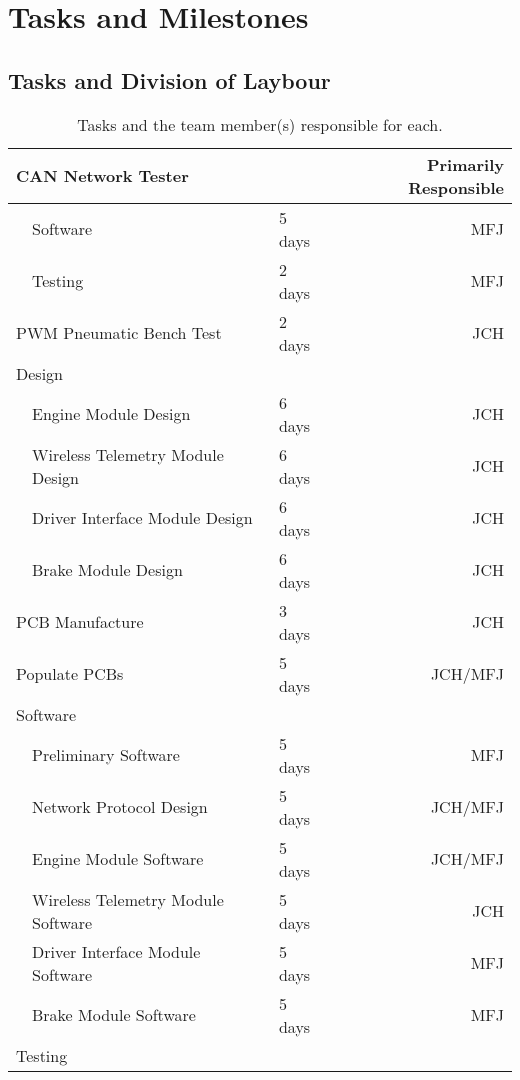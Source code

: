 %
%
%
%

\chapter{Tasks and Milestones}

\section{Tasks and Division of Laybour}

\begin{table}[H]
  \caption{Tasks and the team member(s) responsible for each.}
  \label{table:tasks}
  \centering
  \begin{tabular}{|l|l|l|r|}
  \hline 
  \multicolumn{3}{|l|}{CAN Network Tester} & Primarily Responsible\\
  \hline 
  & Software & 5 days & MFJ\\
  & Testing & 2 days & MFJ\\
  \hline 
  \multicolumn{2}{|l|}{PWM Pneumatic Bench Test} & 2 days & JCH\\
  \hline 
  \multicolumn{3}{|l|}{Design} &\\
  \hline 
  & Engine Module Design & 6 days & JCH\\
  & Wireless Telemetry Module Design & 6 days & JCH\\
  & Driver Interface Module Design & 6 days & JCH\\
  & Brake Module Design & 6 days & JCH\\
  \hline 
  \multicolumn{2}{|l|}{PCB Manufacture} & 3 days & JCH\\
  \hline 
  \multicolumn{2}{|l|}{Populate PCBs} & 5 days & JCH/MFJ\\
  \hline 
  \multicolumn{3}{|l|}{Software} &\\
  \hline 
  & Preliminary Software & 5 days & MFJ\\
  & Network Protocol Design & 5 days & JCH/MFJ\\
  & Engine Module Software & 5 days & JCH/MFJ\\
  & Wireless Telemetry Module Software & 5 days & JCH\\
  & Driver Interface Module Software & 5 days & MFJ\\
  & Brake Module Software & 5 days & MFJ\\
  \hline 
  \multicolumn{3}{|l|}{Testing} &\\

\end{tabular}
\end{table}
